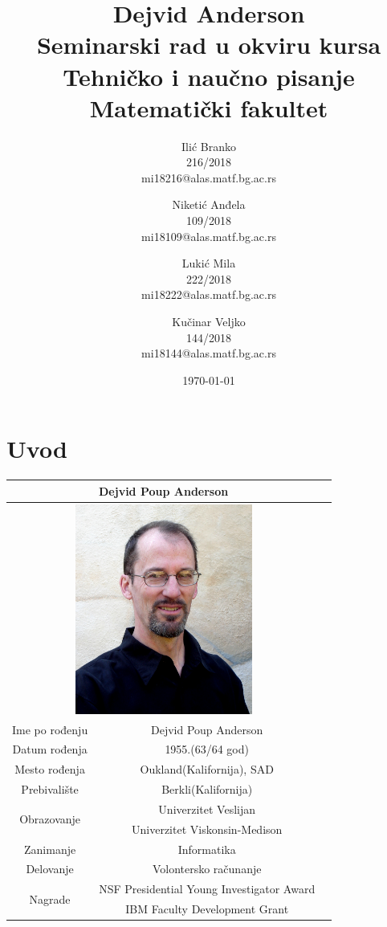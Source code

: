 \documentclass[titlepage, 12pt]{article}
\begin{document}
\title{Dejvid Anderson\\ \small{Seminarski rad u okviru kursa\\Tehničko i naučno pisanje\\ Matematički fakultet}}
\author{Ilić Branko \\ 216/2018 \\mi18216@alas.matf.bg.ac.rs \and  Niketić Anđela \\ 109/2018 \\ mi18109@alas.matf.bg.ac.rs\and Lukić Mila \\ 222/2018 \\mi18222@alas.matf.bg.ac.rs\and Kučinar Veljko \\ 144/2018 \\ mi18144@alas.matf.bg.ac.rs}
\date{\today}

\maketitle
\tableofcontents
\section{Uvod}

\begin{tabular}{|c|c|c|}
\hline
\multicolumn{2}{|c|}{Dejvid Poup Anderson}\\
\hline
\multicolumn{2}{|c|}{\includegraphics[width=220px,height=261px]{dejvid.jpg}}\\

\hline
Ime po rođenju & Dejvid Poup Anderson \\
\hline
Datum rođenja & 1955.(63/64 god)\\
\hline
Mesto rođenja & Oukland(Kalifornija), SAD\\
\hline
Prebivalište & Berkli(Kalifornija)\\
\hline
\multirow{2}{*}{Obrazovanje}&Univerzitet Veslijan\\
&Univerzitet Viskonsin-Medison\\
\hline 
Zanimanje & Informatika\\
\hline
Delovanje & Volontersko računanje \\
\hline
\multirow{2}{*}{Nagrade}&NSF Presidential Young Investigator Award\\
&IBM Faculty Development Grant
\\
\hline
\end{tabular}
\\
\\
\newline
\end{document}

